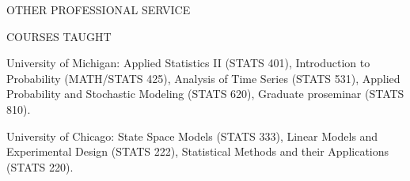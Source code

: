 \begin{mylist}{OTHER PROFESSIONAL SERVICE}



\end{mylist}


\lsp


\begin{mylist}{COURSES TAUGHT}

\item{University of Michigan}: 
Applied Statistics II (STATS 401), 
Introduction to Probability (MATH/STATS 425), 
Analysis of Time Series (STATS 531), 
Applied Probability and Stochastic Modeling (STATS 620), 
Graduate proseminar (STATS 810).

\item{University of Chicago}: State Space
Models (STATS 333), Linear Models and Experimental Design (STATS 222),
Statistical Methods and their Applications (STATS 220). 

\end{mylist}

\lsp

